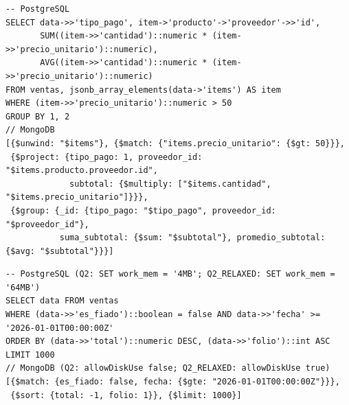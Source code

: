 \documentclass[11pt,a4paper]{article}
\begin{document}
\begin{lstlisting}[caption={Q1 (CPU): desanidar, filtrar, calcular y agrupar}]
-- PostgreSQL
SELECT data->>'tipo_pago', item->'producto'->'proveedor'->>'id',
       SUM((item->>'cantidad')::numeric * (item->>'precio_unitario')::numeric),
       AVG((item->>'cantidad')::numeric * (item->>'precio_unitario')::numeric)
FROM ventas, jsonb_array_elements(data->'items') AS item
WHERE (item->>'precio_unitario')::numeric > 50
GROUP BY 1, 2
// MongoDB
[{$unwind: "$items"}, {$match: {"items.precio_unitario": {$gt: 50}}},
 {$project: {tipo_pago: 1, proveedor_id: "$items.producto.proveedor.id",
             subtotal: {$multiply: ["$items.cantidad", "$items.precio_unitario"]}}},
 {$group: {_id: {tipo_pago: "$tipo_pago", proveedor_id: "$proveedor_id"},
           suma_subtotal: {$sum: "$subtotal"}, promedio_subtotal: {$avg: "$subtotal"}}}]
\end{lstlisting}

\begin{lstlisting}[caption={Q2 (memoria): filtrar y ordenar sin índice, Top-1000}]
-- PostgreSQL (Q2: SET work_mem = '4MB'; Q2_RELAXED: SET work_mem = '64MB')
SELECT data FROM ventas
WHERE (data->>'es_fiado')::boolean = false AND data->>'fecha' >= '2026-01-01T00:00:00Z'
ORDER BY (data->>'total')::numeric DESC, (data->>'folio')::int ASC
LIMIT 1000
// MongoDB (Q2: allowDiskUse false; Q2_RELAXED: allowDiskUse true)
[{$match: {es_fiado: false, fecha: {$gte: "2026-01-01T00:00:00Z"}}},
 {$sort: {total: -1, folio: 1}}, {$limit: 1000}]
\end{lstlisting}
\end{document}
